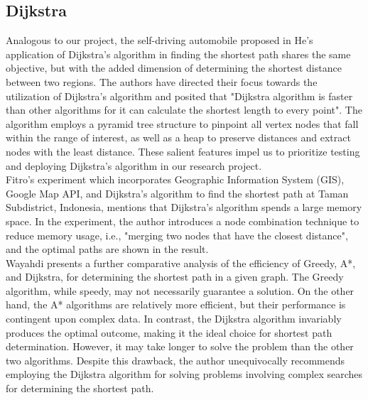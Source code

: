 \documentclass[12pt]{article}
\begin{document}
\subsection{Dijkstra}
Analogous to our project, the self-driving automobile proposed in He's application \cite{He_2022} of Dijkstra's algorithm in finding the shortest path shares the same objective, but with the added dimension of determining the shortest distance between two regions. The authors have directed their focus towards the utilization of Dijkstra's algorithm and posited that "Dijkstra algorithm is faster than other algorithms for it can calculate the shortest length to every point". The algorithm employs a pyramid tree structure to pinpoint all vertex nodes that fall within the range of interest, as well as a heap to preserve distances and extract nodes with the least distance. These salient features impel us to prioritize testing and deploying Dijkstra's algorithm in our research project. \\
Fitro's experiment \cite{Fitro_2018} which incorporates Geographic Information System (GIS), Google Map API, and Dijkstra's algorithm to find the shortest path at Taman Subdistrict, Indonesia, mentions that Dijkstra's algorithm spends a large memory space. In the experiment, the author introduces a node combination technique to reduce memory usage, i.e., "merging two nodes that have the closest distance", and the optimal paths are shown in the result. \\
Wayahdi \cite{Wayahdi_2021_GreedyAA} presents a further comparative analysis of the efficiency of Greedy, A*, and Dijkstra, for determining the shortest path in a given graph. The Greedy algorithm, while speedy, may not necessarily guarantee a solution. On the other hand, the A* algorithms are relatively more efficient, but their performance is contingent upon complex data. In contrast, the Dijkstra algorithm invariably produces the optimal outcome, making it the ideal choice for shortest path determination. However, it may take longer to solve the problem than the other two algorithms. Despite this drawback, the author unequivocally recommends employing the Dijkstra algorithm for solving problems involving complex searches for determining the shortest path.
\end{document}
